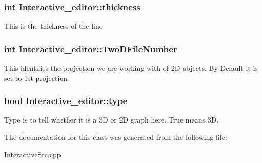 \subsubsection[{\texorpdfstring{thickness}{thickness}}]{\setlength{\rightskip}{0pt plus 5cm}int Interactive\+\_\+editor\+::thickness}\hypertarget{classInteractive__editor_a65f9bb481055109e9d52e2a6bc2db58e}{}\label{classInteractive__editor_a65f9bb481055109e9d52e2a6bc2db58e}
This is the thickness of the line 
\subsubsection[{\texorpdfstring{Two\+D\+File\+Number}{TwoDFileNumber}}]{\setlength{\rightskip}{0pt plus 5cm}int Interactive\+\_\+editor\+::\+Two\+D\+File\+Number}\hypertarget{classInteractive__editor_a016e5e8e9a124977ab6048c90980be97}{}\label{classInteractive__editor_a016e5e8e9a124977ab6048c90980be97}
This identifies the projection we are working with of 2D objects. By Default it is set to 1st projection 
\subsubsection[{\texorpdfstring{type}{type}}]{\setlength{\rightskip}{0pt plus 5cm}bool Interactive\+\_\+editor\+::type}\hypertarget{classInteractive__editor_a93c2f2041e432c8047d51942345cc3f9}{}\label{classInteractive__editor_a93c2f2041e432c8047d51942345cc3f9}
Type is to tell whether it is a 3D or 2D graph here. True means 3D. 

The documentation for this class was generated from the following file\+:\begin{DoxyCompactItemize}
\item 
\hyperlink{InteractiveSrc_8cpp}{Interactive\+Src.\+cpp}\end{DoxyCompactItemize}

